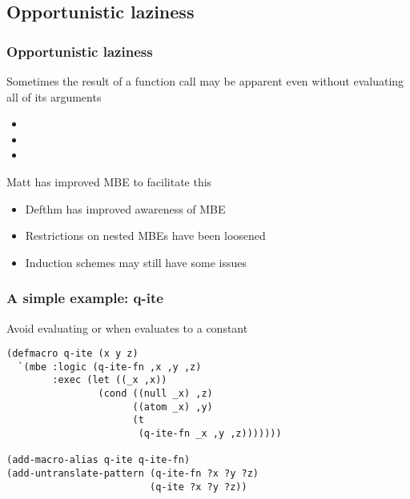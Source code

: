 
\subsection{Opportunistic laziness}

\begin{frame}[fragile]
\frametitle{Opportunistic laziness}

Sometimes the result of a function call may be apparent even without evaluating
all of its arguments
\begin{itemize}
\item {}
\item {}
\item {}
\end{itemize}

\SmallSkip
Matt has improved MBE to facilitate this
\begin{itemize}
\item Defthm has improved awareness of MBE
\item Restrictions on nested MBEs have been loosened
\item Induction schemes may still have some issues
\end{itemize}

\end{frame}


\begin{frame}[fragile]
\frametitle{A simple example: q-ite}

Avoid evaluating  or  when  evaluates to a constant

\begin{verbatim}
(defmacro q-ite (x y z) 
  `(mbe :logic (q-ite-fn ,x ,y ,z)
        :exec (let ((_x ,x))
                (cond ((null _x) ,z)
                      ((atom _x) ,y)
                      (t
                       (q-ite-fn _x ,y ,z)))))))

(add-macro-alias q-ite q-ite-fn)
(add-untranslate-pattern (q-ite-fn ?x ?y ?z)
                         (q-ite ?x ?y ?z))
\end{verbatim}
\end{frame}



